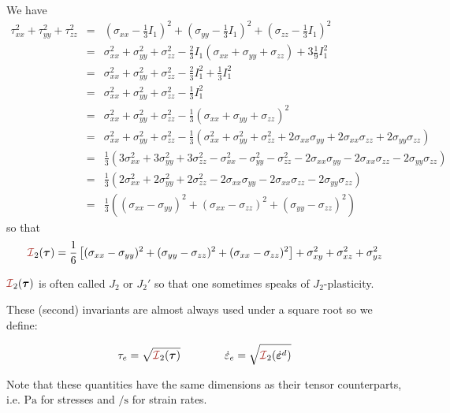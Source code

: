 We have 
\begin{eqnarray}
\tau_{xx}^2 + \tau_{yy}^2 + \tau_{zz}^2
&=& 
\left(\sigma_{xx}-\frac13 I_1\right)^2 + 
\left(\sigma_{yy}-\frac13 I_1\right)^2 + 
\left(\sigma_{zz}-\frac13 I_1\right)^2  \nonumber\\
&=&
\sigma_{xx}^2 + \sigma_{yy}^2 + \sigma_{zz}^2 
-\frac23 I_1 (\sigma_{xx} + \sigma_{yy} + \sigma_{zz}) 
+3\frac19 I_1^2 \nonumber\\
&=&
\sigma_{xx}^2 + \sigma_{yy}^2 + \sigma_{zz}^2 
-\frac23 I_1^2 +\frac13 I_1^2 \nonumber\\
&=&
\sigma_{xx}^2 + \sigma_{yy}^2 + \sigma_{zz}^2 
-\frac13 I_1^2  \nonumber\\
&=&
\sigma_{xx}^2 + \sigma_{yy}^2 + \sigma_{zz}^2 
-\frac13 (\sigma_{xx} + \sigma_{yy} + \sigma_{zz})^2 \nonumber\\
&=&
\sigma_{xx}^2 + \sigma_{yy}^2 + \sigma_{zz}^2 
-\frac13 (\sigma_{xx}^2 + \sigma_{yy}^2 + \sigma_{zz}^2
+2\sigma_{xx}\sigma_{yy}+2\sigma_{xx}\sigma_{zz}+2\sigma_{yy}\sigma_{zz} ) 
\nonumber\\
&=& \frac13 (
3\sigma_{xx}^2 + 3\sigma_{yy}^2 + 3\sigma_{zz}^2 
-\sigma_{xx}^2 - \sigma_{yy}^2 - \sigma_{zz}^2
-2\sigma_{xx}\sigma_{yy}-2\sigma_{xx}\sigma_{zz}-2\sigma_{yy}\sigma_{zz} ) 
\nonumber\\
&=& \frac13 (
2\sigma_{xx}^2 + 2\sigma_{yy}^2 + 2\sigma_{zz}^2 
-2 \sigma_{xx}\sigma_{yy}-2 \sigma_{xx}\sigma_{zz}-2 \sigma_{yy}\sigma_{zz} )\\
&=& \frac13 ((\sigma_{xx}-\sigma_{yy})^2 + (\sigma_{xx}-\sigma_{zz})^2
+ (\sigma_{yy}-\sigma_{zz})^2)
\end{eqnarray}
so that 
\[
{\III}_2({\bm \tau})   
=\frac{1}{6}\left[(\sigma_{xx}-\sigma_{yy})^2 + (\sigma_{yy}-\sigma_{zz})^2 + (\sigma_{xx}-\sigma_{zz})^2 \right]  
+ \sigma_{xy}^2 + \sigma_{xz}^2 + \sigma_{yz}^2 
\]

\begin{remark}
${\III}_2({\bm \tau})$ is often called $J_2$ or $J_2'$ so that one sometimes speaks of $J_2$-plasticity.
\end{remark}

These (second) invariants are almost always used under a square root so we define:
\begin{mdframed}[backgroundcolor=blue!5]
\begin{equation}
\tau_{e}=\sqrt{{\III}_2({\bm \tau})}
\quad\quad
\quad\quad
\dot{\varepsilon}_{e}=\sqrt{{\III}_2(\dot{\bm \varepsilon}^d)}
\label{eq:tauepse}
\end{equation}
\end{mdframed}
Note that these quantities have the same dimensions as their tensor counterparts, i.e. $\si{\pascal}$ 
for stresses and $\si{\per\second}$ for strain rates.


